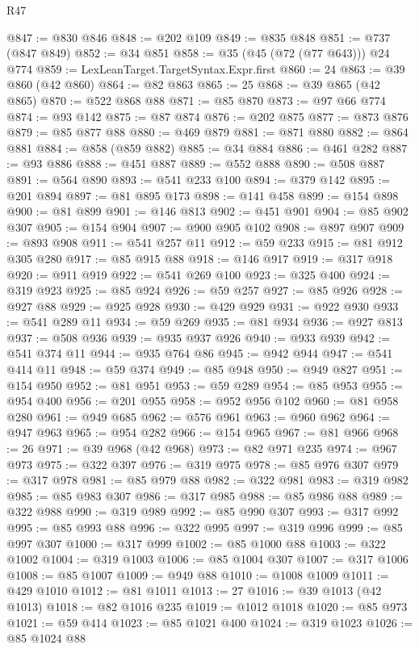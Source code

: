 \begin{lexlean}{R47}
\begin{coremodule}
@847 := @830 @846
@848 := @202 @109
@849 := @835 @848
@851 := @737 (@847 @849)
@852 := @34 @851
@858 := @35 (@45 (@72 (@77 @643))) @24 @774
@859 := LexLeanTarget.TargetSyntax.Expr.first
@860 := 24
@863 := @39 @860 (@42 @860)
@864 := @82 @863
@865 := 25
@868 := @39 @865 (@42 @865)
@870 := @522 @868 @88
@871 := @85 @870
@873 := @97 @66 @774
@874 := @93 @142
@875 := @87 @874
@876 := @202 @875
@877 := @873 @876
@879 := @85 @877 @88
@880 := @469 @879
@881 := @871 @880
@882 := @864 @881
@884 := @858 (@859 @882)
@885 := @34 @884
@886 := @461 @282
@887 := @93 @886
@888 := @451 @887
@889 := @552 @888
@890 := @508 @887
@891 := @564 @890
@893 := @541 @233 @100
@894 := @379 @142
@895 := @201 @894
@897 := @81 @895 @173
@898 := @141 @458
@899 := @154 @898
@900 := @81 @899
@901 := @146 @813
@902 := @451 @901
@904 := @85 @902 @307
@905 := @154 @904
@907 := @900 @905 @102
@908 := @897 @907
@909 := @893 @908
@911 := @541 @257 @11
@912 := @59 @233
@915 := @81 @912 @305 @280
@917 := @85 @915 @88
@918 := @146 @917
@919 := @317 @918
@920 := @911 @919
@922 := @541 @269 @100
@923 := @325 @400
@924 := @319 @923
@925 := @85 @924
@926 := @59 @257
@927 := @85 @926
@928 := @927 @88
@929 := @925 @928
@930 := @429 @929
@931 := @922 @930
@933 := @541 @289 @11
@934 := @59 @269
@935 := @81 @934
@936 := @927 @813
@937 := @508 @936
@939 := @935 @937 @926
@940 := @933 @939
@942 := @541 @374 @11
@944 := @935 @764 @86
@945 := @942 @944
@947 := @541 @414 @11
@948 := @59 @374
@949 := @85 @948
@950 := @949 @827
@951 := @154 @950
@952 := @81 @951
@953 := @59 @289
@954 := @85 @953
@955 := @954 @400
@956 := @201 @955
@958 := @952 @956 @102
@960 := @81 @958 @280
@961 := @949 @685
@962 := @576 @961
@963 := @960 @962
@964 := @947 @963
@965 := @954 @282
@966 := @154 @965
@967 := @81 @966
@968 := 26
@971 := @39 @968 (@42 @968)
@973 := @82 @971 @235
@974 := @967 @973
@975 := @322 @397
@976 := @319 @975
@978 := @85 @976 @307
@979 := @317 @978
@981 := @85 @979 @88
@982 := @322 @981
@983 := @319 @982
@985 := @85 @983 @307
@986 := @317 @985
@988 := @85 @986 @88
@989 := @322 @988
@990 := @319 @989
@992 := @85 @990 @307
@993 := @317 @992
@995 := @85 @993 @88
@996 := @322 @995
@997 := @319 @996
@999 := @85 @997 @307
@1000 := @317 @999
@1002 := @85 @1000 @88
@1003 := @322 @1002
@1004 := @319 @1003
@1006 := @85 @1004 @307
@1007 := @317 @1006
@1008 := @85 @1007
@1009 := @949 @88
@1010 := @1008 @1009
@1011 := @429 @1010
@1012 := @81 @1011
@1013 := 27
@1016 := @39 @1013 (@42 @1013)
@1018 := @82 @1016 @235
@1019 := @1012 @1018
@1020 := @85 @973
@1021 := @59 @414
@1023 := @85 @1021 @400
@1024 := @319 @1023
@1026 := @85 @1024 @88

\end{coremodule}
\end{lexlean}
